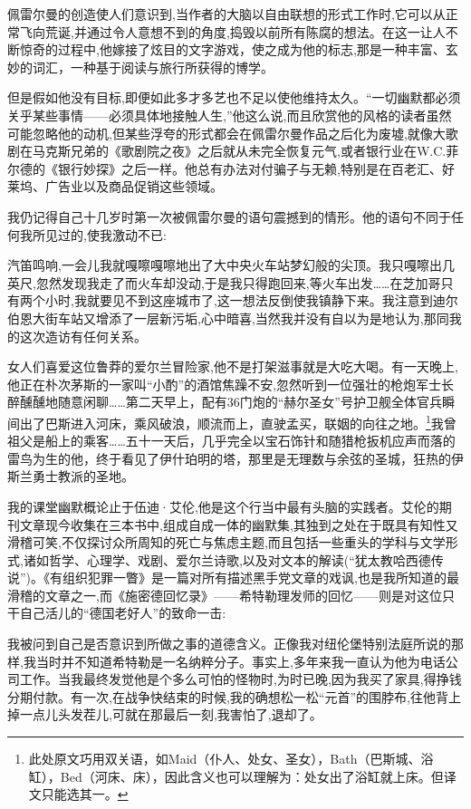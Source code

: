 佩雷尔曼的创造使人们意识到,当作者的大脑以自由联想的形式工作时,它可以从正常飞向荒诞,并通过令人意想不到的角度,捣毁以前所有陈腐的想法。在这一让人不断惊奇的过程中,他嫁接了炫目的文字游戏，使之成为他的标志,那是一种丰富、玄妙的词汇，一种基于阅读与旅行所获得的博学。

但是假如他没有目标,即便如此多才多艺也不足以使他维持太久。“一切幽默都必须关乎某些事情——必须具体地接触人生,”他这么说,而且欣赏他的风格的读者虽然可能忽略他的动机,但某些浮夸的形式都会在佩雷尔曼作品之后化为废墟,就像大歌剧在马克斯兄弟的《歌剧院之夜》之后就从未完全恢复元气,或者银行业在W.C.菲尔德的《银行妙探》之后一样。他总有办法对付骗子与无赖,特别是在百老汇、好莱坞、广告业以及商品促销这些领域。

我仍记得自己十几岁时第一次被佩雷尔曼的语句震撼到的情形。他的语句不同于任何我所见过的,使我激动不已:

汽笛鸣响,一会儿我就嘎嚓嘎嚓地出了大中央火车站梦幻般的尖顶。我只嘎嚓出几英尺,忽然发现我走了而火车却没动,于是我只得跑回来,等火车出发……在芝加哥只有两个小时,我就要见不到这座城市了,这一想法反倒使我镇静下来。我注意到迪尔伯恩大街车站又增添了一层新污垢,心中暗喜,当然我并没有自以为是地认为,那同我的这次造访有任何关系。

女人们喜爱这位鲁莽的爱尔兰冒险家,他不是打架滋事就是大吃大喝。有一天晚上,他正在朴次茅斯的一家叫“小酌”的酒馆焦躁不安,忽然听到一位强壮的枪炮军士长醉醺醺地随意闲聊……第二天早上，配有36门炮的“赫尔圣女”号护卫舰全体官兵瞬间出了巴斯进入河床，乘风破浪，顺流而上，直驶孟买，联姻的向往之地。\footnote{此处原文巧用双关语，如Maid（仆人、处女、圣女），Bath（巴斯城、浴缸），Bed（河床、床），因此含义也可以理解为：处女出了浴缸就上床。但译文只能选其一。}我曾祖父是船上的乘客……五十一天后，几乎完全以宝石饰针和随猎枪扳机应声而落的雷鸟为生的他，终于看见了伊什珀明的塔，那里是无理数与余弦的圣城，狂热的伊斯兰勇士教派的圣地。


我的课堂幽默概论止于伍迪·艾伦,他是这个行当中最有头脑的实践者。艾伦的期刊文章现今收集在三本书中,组成自成一体的幽默集,其独到之处在于既具有知性又滑稽可笑,不仅探讨众所周知的死亡与焦虑主题,而且包括一些重头的学科与文学形式,诸如哲学、心理学、戏剧、爱尔兰诗歌,以及对文本的解读(“犹太教哈西德传说”)。《有组织犯罪一瞥》是一篇对所有描述黑手党文章的戏讽,也是我所知道的最滑稽的文章之一,而《施密德回忆录》——希特勒理发师的回忆——则是对这位只干自己活儿的“德国老好人”的致命一击:

我被问到自己是否意识到所做之事的道德含义。正像我对纽伦堡特别法庭所说的那样,我当时并不知道希特勒是一名纳粹分子。事实上,多年来我一直认为他为电话公司工作。当我最终发觉他是个多么可怕的怪物时,为时已晚,因为我买了家具,得挣钱分期付款。有一次,在战争快结束的时候,我的确想松一松“元首”的围脖布,往他背上掉一点儿头发茬儿,可就在那最后一刻,我害怕了,退却了。

